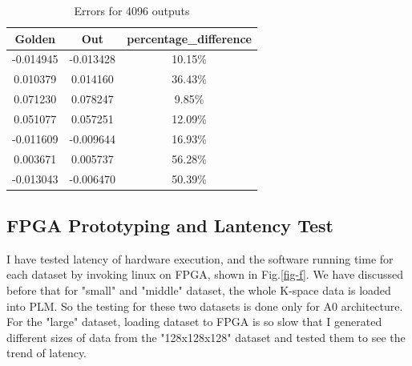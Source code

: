 \documentclass{sig-alternate}
\begin{document}
\begin{table}[ht!]
    \centering
    \begin{tabular}{c|c|c}
    \hline
Golden  & Out       &percentage\_difference \\
\hline
-0.014945& -0.013428&  10.15\% \\                                                                            
0.010379 & 0.014160  & 36.43\% \\                                                                           
0.071230 & 0.078247  & 9.85\% \\                                                                            
0.051077 & 0.057251  & 12.09\% \\                                                                           
-0.011609& -0.009644 & 16.93\% \\                                                                          
0.003671 & 0.005737  & 56.28\% \\                                                                           
-0.013043 &-0.006470 &  50.39\% \\    
\hline
    \end{tabular}
    \caption{Errors for 4096 outputs}
    \label{tab-9}
\end{table}











\subsection{FPGA Prototyping and Lantency Test}
I have tested latency of hardware execution, and the software running time for each dataset by invoking linux on FPGA, shown in Fig.\ref{fig-f}. We have discussed before that for "small" and "middle" dataset, the whole K-space data is loaded into PLM. So the testing for these two datasets is done only for A0 architecture. For the "large" dataset, loading dataset to FPGA is so slow that I generated different sizes of data from the "128x128x128" dataset and tested them to see the trend of latency.\\
\end{document}
